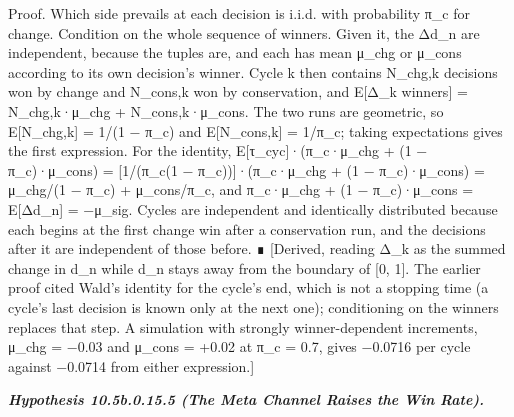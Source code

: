\documentclass[
]{article}
\begin{document}
Proof. Which side prevails at each decision is i.i.d. with probability
π\_c for change. Condition on the whole sequence of winners. Given it,
the Δd\_n are independent, because the tuples are, and each has mean
μ\_chg or μ\_cons according to its own decision's winner. Cycle k then
contains N\_chg,k decisions won by change and N\_cons,k won by
conservation, and E{[}Δ\_k \textbar{} winners{]} = N\_chg,k·μ\_chg +
N\_cons,k·μ\_cons. The two runs are geometric, so E{[}N\_chg,k{]} = 1/(1
− π\_c) and E{[}N\_cons,k{]} = 1/π\_c; taking expectations gives the
first expression. For the identity, E{[}τ\_cyc{]}·(π\_c·μ\_chg + (1 −
π\_c)·μ\_cons) = {[}1/(π\_c(1 − π\_c)){]}·(π\_c·μ\_chg + (1 −
π\_c)·μ\_cons) = μ\_chg/(1 − π\_c) + μ\_cons/π\_c, and π\_c·μ\_chg + (1
− π\_c)·μ\_cons = E{[}Δd\_n{]} = −μ\_sig. Cycles are independent and
identically distributed because each begins at the first change win
after a conservation run, and the decisions after it are independent of
those before. ∎ {[}Derived, reading Δ\_k as the summed change in d\_n
while d\_n stays away from the boundary of {[}0, 1{]}. The earlier proof
cited Wald's identity for the cycle's end, which is not a stopping time
(a cycle's last decision is known only at the next one); conditioning on
the winners replaces that step. A simulation with strongly
winner-dependent increments, μ\_chg = −0.03 and μ\_cons = +0.02 at π\_c
= 0.7, gives −0.0716 per cycle against −0.0714 from either
expression.{]}

\emph{\textbf{Hypothesis 10.5b.0.15.5 (The Meta Channel Raises the Win
Rate).}}
\end{document}

